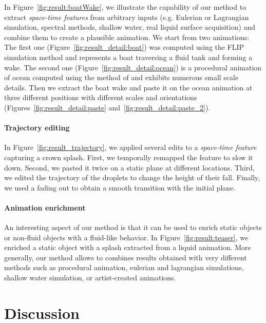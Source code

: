 In Figure~\ref{fig:result:boatWake}, we illustrate the capability of our method to extract \emph{space-time features} from arbitrary inputs (e.g. Eulerian or Lagrangian simulation, spectral methods, shallow water, real liquid surface acquisition) and combine them to create a plausible animation.
We start from two animations: 
The first one (Figure~\ref{fig:result_detail:boat}) 
was computed using the FLIP simulation method \cite{Zhu2005} and represents a boat traversing a fluid tank and forming a wake.
The second one (Figure~\ref{fig:result_detail:ocean}) is a procedural animation of ocean computed using the method of \cite{Tessendorf2004} and exhibits numerous small scale details.
Then we extract the boat wake and paste it on the ocean animation at three different positions with different scales and orientations (Figures~\ref{fig:result_detail:paste} and~\ref{fig:result_detail:paste_2}).

\paragraph{Trajectory editing}

In Figure~\ref{fig:result_trajectory}, we applied several edits to a \emph{space-time feature} capturing a crown splash. First, we temporally remapped the feature to slow it down. 
Second, we pasted it twice on a static plane at different locations. 
Third, we edited the trajectory of the droplets to change the height of their fall. 
Finally, we used a fading out to obtain a smooth transition with the initial plane.

\paragraph{Animation enrichment}

An interesting aspect of our method is that it can be used to enrich static objects or non-fluid objects with a fluid-like behavior. 
In Figure~\ref{fig:result:teaser}, we enriched a static object with a splash extracted from a liquid animation.
More generally, our method allows to combines results obtained with very different methods such as procedural animation, eulerian and lagrangian simulations, shallow water simulation, or artist-created animations.

\section{Discussion} \label{sec:discussion}

